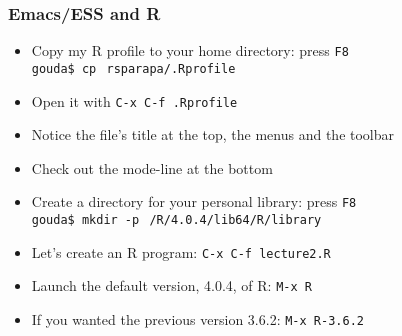 \documentclass[11pt,pdftex,dvipsnames,usenames,helvetica]{beamer}
\begin{document}
\begin{frame}
\frametitle{Emacs/ESS and R}
\begin{itemize}
\item Copy my R profile to your home directory: press {\tt F8} \\ 
{\tt gouda\$ cp $~$rsparapa/.Rprofile $~$}
\item Open it with {\tt C-x C-f .Rprofile}
\item Notice the file's title at the top, the menus and the toolbar
\item Check out the mode-line at the bottom
\item Create a directory for your personal library: press {\tt F8} \\
{\tt gouda\$ mkdir -p $~$/R/4.0.4/lib64/R/library}
\item Let's create an R program: {\tt C-x C-f lecture2.R}
\item Launch the default version, 4.0.4, of R: {\tt M-x R}
\item If you wanted the previous version 3.6.2: {\tt M-x R-3.6.2}
\end{itemize}
\end{frame}
\end{document}
